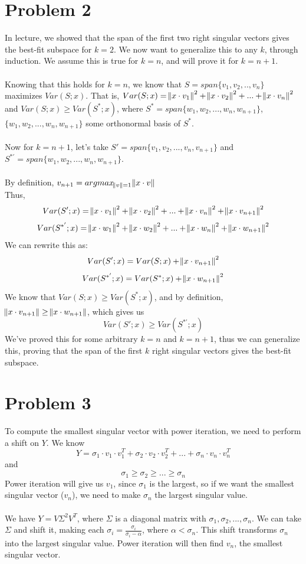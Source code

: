 \documentclass[12pt, letterpaper]{article}
\begin{document}
\section{Problem 2}
In lecture, we showed that the span of the first two right singular vectors gives the best-fit subspace for $k=2$. We now want to generalize this to any $k$, through induction. We assume this is true for $k=n$, and will prove it for $k=n+1$.\\
\\
Knowing that this holds for $k=n$, we know that $S=span\{v_1,v_2,..,v_n\}$ maximizes $Var(S;x)$. That is, $Var(S;x) = \norm{x \cdot v_1}^2+\norm{x \cdot v_2}^2+...+\norm{x \cdot v_n}^2$ and $Var(S;x) \geq Var(S^*;x)$, where $S^*=span\{w_1,w_2,...,w_n,w_{n+1}\}$, $\{w_1,w_2,...,w_n,w_{n+1}\}$ some orthonormal basis of $S^*$.\\
\\
Now for $k=n+1$, let's take $S'=span\{v_1,v_2,...,v_n,v_{n+1}\}$ and $S^{*'}=span\{w_1,w_2,...,w_n,w_{n+1}\}$.\\
\\
By definition, $v_{n+1}=argmax_{\norm{v}=1}\norm{x\cdot v}$\\
Thus,
\[Var(S';x)=\norm{x \cdot v_1}^2+\norm{x \cdot v_2}^2+...+\norm{x \cdot v_n}^2+\norm{x \cdot v_{n+1}}^2\]
\[Var(S^{*'};x)=\norm{x \cdot w_1}^2+\norm{x \cdot w_2}^2+...+\norm{x \cdot w_n}^2+\norm{x \cdot w_{n+1}}^2\]
We can rewrite this as:
\[Var(S';x)=Var(S;x)+\norm{x \cdot v_{n+1}}^2\]
\[Var(S^{*'};x)=Var(S^*;x)+\norm{x \cdot w_{n+1}}^2\]
We know that $Var(S;x)\geq Var(S^*;x)$, and by definition, $\norm{x\cdot v_{n+1}}\geq\norm{x\cdot w_{n+1}}$, which gives us
\[Var(S';x)\geq Var(S^{*'};x)\]
We've proved this for some arbitrary $k=n$ and $k=n+1$, thus we can generalize this, proving that the span of the first $k$ right singular vectors gives the best-fit subspace.


\newpage
\section{Problem 3}
To compute the smallest singular vector with power iteration, we need to perform a shift on $Y$. We know 
\[Y=\sigma_1\cdot v_1\cdot v_1^T+\sigma_2\cdot v_2\cdot v_2^T+...+\sigma_n\cdot v_n\cdot v_n^T\]
and 
\[\sigma_1 \geq \sigma_2 \geq ... \geq \sigma_n\]
Power iteration will give us $v_1$, since $\sigma_1$ is the largest, so if we want the smallest singular vector ($v_n$), we need to make $\sigma_n$ the largest singular value. \\
\\
We have $Y=V\Sigma^2V^T$, where $\Sigma$ is a diagonal matrix with $\sigma_1, \sigma_2,...,\sigma_n$. We can take $\Sigma$ and shift it, making each $\sigma_i=\frac{\sigma_i}{\sigma_i-\alpha}$, where $\alpha<\sigma_n$. This shift transforms $\sigma_n$ into the largest singular value. Power iteration will then find $v_n$, the smallest singular vector.
\end{document}
